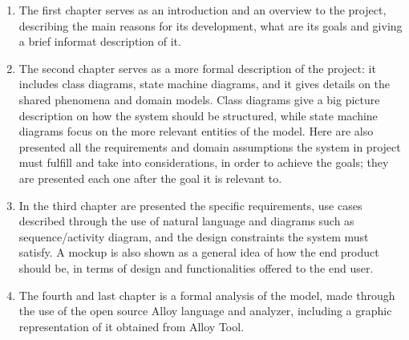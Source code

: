 \documentclass[../main.tex]{subfiles}
\begin{document}
\begin{enumerate}
	\item The first chapter serves as an introduction and an overview to the project, describing the main reasons for its development, what are its goals and giving a brief informat description of it.

	\item The second chapter serves as a more formal description of the project: it includes class diagrams, state machine diagrams, and it gives details on the shared phenomena and domain models. Class diagrams give a big picture description on how the system should be structured, while state machine diagrams focus on the more relevant entities of the model. Here are also presented all the requirements and domain assumptions the system in project must fulfill and take into considerations, in order to achieve the goals; they are presented each one after the goal it is relevant to.

	\item In the third chapter are presented the specific requirements, use cases described through the use of natural language and diagrams such as sequence/activity diagram, and the design constraints the system must satisfy. A mockup is also shown as a general idea of how the end product should be, in terms of design and functionalities offered to the end user.

	\item The fourth and last chapter is a formal analysis of the model, made through the use of the open source Alloy language and analyzer, including a graphic representation of it obtained from Alloy Tool.
\end{enumerate}
\end{document}
